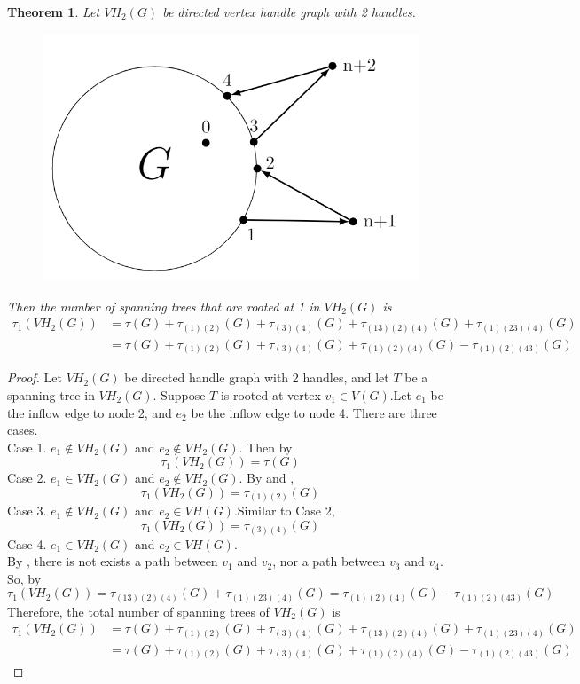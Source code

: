 \documentclass[twoside,11pt]{article}
\newtheorem{theorem}{Theorem}[section]
\numberwithin{equation}{section} \DeclareMathOperator{\Var}{Var}
\newcommand{\bpf}{\begin{proof}}
\newcommand{\epf}{\end{proof}}
\newcommand{\bthm}{\begin{theorem}}
\newcommand{\ethm}{\end{theorem}}
\begin{document}
\bthm
Let $VH_2(G)$ be directed vertex handle graph with 2 handles.
\begin{figure}[H]
    \centering
    \includegraphics[scale=0.4]{tik_2handles.PNG}
\end{figure}
Then the number of spanning trees that are rooted at 1 in $VH_2(G)$ is
\begin{equation*}
    \begin{split}
        \tau_1(VH_2(G)) &= \tau(G)+\tau_{(1)(2)}(G)+\tau_{(3)(4)}(G)+
 \tau_{(13)(2)(4)}(G)+\tau_{(1)(23)(4)}(G)  \\
 & = \tau(G)+\tau_{(1)(2)}(G)+\tau_{(3)(4)}(G)+
 \tau_{(1)(2)(4)}(G)-\tau_{(1)(2)(43)}(G)
    \end{split}
\end{equation*}
\ethm

\bpf
Let $VH_2(G)$ be directed handle graph with 2 handles, and let $T$ be a spanning tree in $VH_2(G)$. Suppose $T$ is rooted at vertex $v_1\in V(G)$.Let $e_1$ be the inflow edge to node 2, and $e_2$ be the inflow edge to node 4. There are three cases.\\
Case 1. $e_1\notin VH_2(G)$ and $e_2\notin VH_2(G)$. Then by  $$\tau_1(VH_2(G))=\tau(G)$$ 
Case 2. $e_1\in VH_2(G)$ and $e_2\notin VH_2(G)$. By  and , $$\tau_1(VH_2(G)) = \tau_{(1)(2)}(G)$$
Case 3. $e_1\notin VH_2(G)$ and $e_2\in VH(G)$.Similar to Case 2,  $$\tau_1(VH_2(G)) = \tau_{(3)(4)}(G)$$
Case 4. $e_1\in VH_2(G)$ and $e_2\in VH(G)$.\\
By , there is not exists a path between $v_1$ and $v_2$, nor a path between  $v_3$ and $v_4$. So, by 
$$\tau_1(VH_2(G)) = \tau_{(13)(2)(4)}(G)+\tau_{(1)(23)(4)}(G) = \tau_{(1)(2)(4)}(G)-\tau_{(1)(2)(43)}(G)$$
Therefore, the total number of spanning trees of $VH_2(G)$ is \begin{equation*}
    \begin{split}
        \tau_1(VH_2(G)) &= \tau(G)+\tau_{(1)(2)}(G)+\tau_{(3)(4)}(G)+
 \tau_{(13)(2)(4)}(G)+\tau_{(1)(23)(4)}(G)  \\
 & = \tau(G)+\tau_{(1)(2)}(G)+\tau_{(3)(4)}(G)+
 \tau_{(1)(2)(4)}(G)-\tau_{(1)(2)(43)}(G)
    \end{split}
\end{equation*}
\epf
\end{document}
